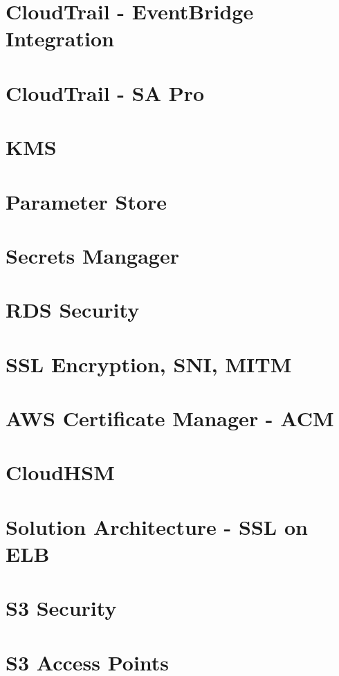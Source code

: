 \documentclass[11pt]{book}
\begin{document}
    \section{CloudTrail - EventBridge Integration}


    \section{CloudTrail - SA Pro}


    \section{KMS}


    \section{Parameter Store}


    \section{Secrets Mangager}


    \section{RDS Security}


    \section{SSL Encryption, SNI, MITM}


    \section{AWS Certificate Manager - ACM}


    \section{CloudHSM}


    \section{Solution Architecture - SSL on ELB}


    \section{S3 Security}


    \section{S3 Access Points}
\end{document}
